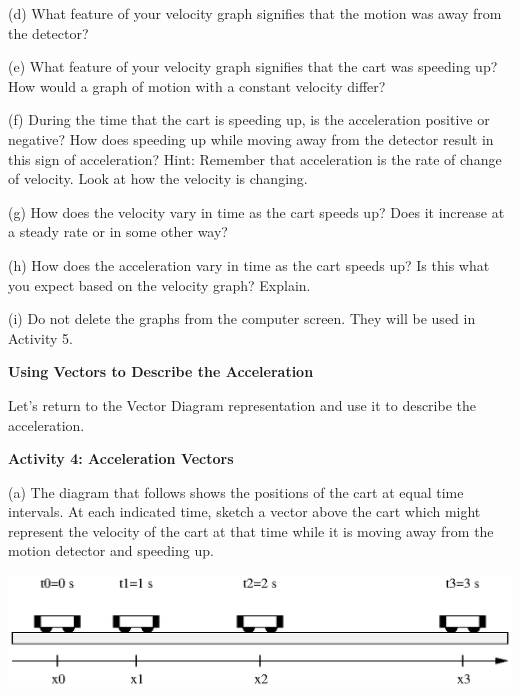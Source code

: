 (d) What feature of your velocity graph signifies that the motion was away from
the detector? 
\vspace{13mm}

(e) What feature of your velocity graph signifies that the cart was speeding
up? How would a graph of motion with a constant velocity differ? 
\vspace{13mm}

(f) During the time that the cart is speeding up, is the acceleration positive
or negative? How does speeding up while moving away from the detector result
in this sign of acceleration? Hint: Remember that acceleration is the rate of
change of velocity. Look at how the velocity is changing. 
\vspace{13mm}

(g) How does the velocity vary in time as the cart speeds up? Does it increase
at a steady rate or in some other way? 
\vspace{13mm}

(h) How does the acceleration vary in time as the cart speeds up? Is this what
you expect based on the velocity graph? Explain.
\vspace{13mm}

(i) Do not delete the graphs from the computer screen.  They will be used in Activity 5.
\vspace{10mm}

\textbf{Using Vectors to Describe the Acceleration} 

Let's return to the Vector Diagram representation and use it to describe the
acceleration.

\textbf{Activity 4: Acceleration Vectors} 

(a) The diagram that follows shows the positions of the cart at equal time intervals.
At each indicated time, sketch a vector above the cart which might represent
the velocity of the cart at that time while it is moving away from the motion
detector and speeding up.

\vspace{0.3cm}
{\par\centering \includegraphics{changing/changing_fig4.eps} \par}
\vspace{0.3cm}

